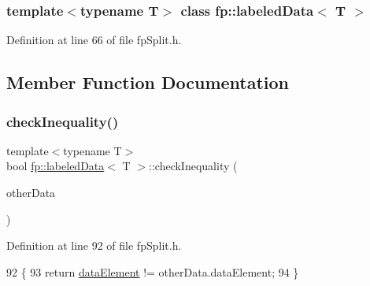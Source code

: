 \subsubsection*{template$<$typename T$>$\newline
class fp\+::labeled\+Data$<$ T $>$}



Definition at line 66 of file fp\+Split.\+h.



\subsection{Member Function Documentation}
\mbox{\label{classfp_1_1labeledData_af0ac4ee41fe9b5d4d50fd58b2839027a}} 
\subsubsection{\texorpdfstring{check\+Inequality()}{checkInequality()}}
{\footnotesize\ttfamily template$<$typename T$>$ \\
bool \hyperlink{classfp_1_1labeledData}{fp\+::labeled\+Data}$<$ T $>$\+::check\+Inequality (\begin{DoxyParamCaption}\item[{const \hyperlink{classfp_1_1labeledData}{labeled\+Data}$<$ T $>$ \&}]{other\+Data }\end{DoxyParamCaption})\hspace{0.3cm}{\ttfamily [inline]}}



Definition at line 92 of file fp\+Split.\+h.


\begin{DoxyCode}
92                                                                             \{
93                     \textcolor{keywordflow}{return} \hyperlink{classfp_1_1labeledData_a02564fc812e8a1f4d4ca6edab114d246}{dataElement} != otherData.dataElement;
94                 \}
\end{DoxyCode}
\mbox{\label{classfp_1_1labeledData_ae55f357a65fd80b3ebf50a2e9467c5ad}} 
